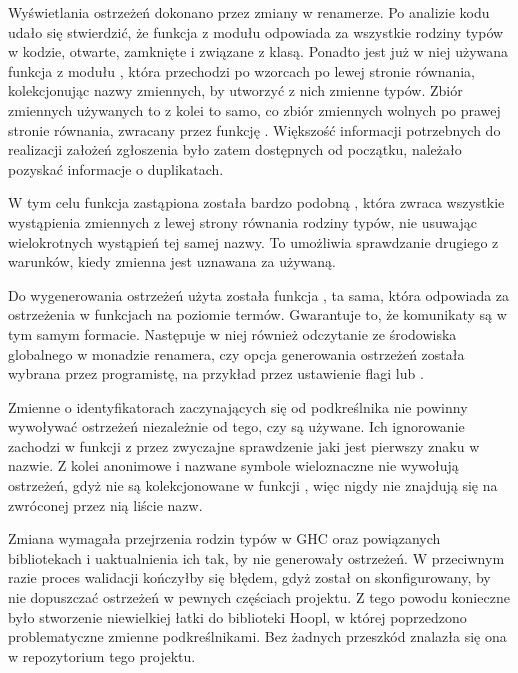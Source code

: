 Wyświetlania ostrzeżeń dokonano przez zmiany w renamerze. Po analizie kodu udało
się stwierdzić, że funkcja  z modułu  odpowiada za wszystkie rodziny
typów w kodzie, otwarte, zamknięte i związane z klasą. Ponadto jest już w niej
używana funkcja  z modułu , która
przechodzi po wzorcach po lewej stronie równania,
kolekcjonując nazwy zmiennych, by utworzyć z nich zmienne typów. Zbiór zmiennych
używanych to z kolei to samo, co zbiór zmiennych wolnych po prawej stronie
równania, zwracany przez funkcję . Większość informacji
potrzebnych do realizacji założeń zgłoszenia było zatem dostępnych od początku,
należało pozyskać informacje o duplikatach.

W tym celu funkcja  zastąpiona została
bardzo podobną , która zwraca wszystkie
wystąpienia zmiennych z lewej strony równania rodziny typów, nie usuwając wielokrotnych wystąpień tej samej
nazwy. To umożliwia sprawdzanie drugiego z warunków, kiedy zmienna jest
uznawana za używaną.

Do wygenerowania ostrzeżeń użyta została funkcja , ta
sama, która odpowiada za ostrzeżenia w funkcjach na poziomie termów. Gwarantuje
to, że komunikaty są w tym samym formacie. Następuje w niej również
odczytanie ze środowiska globalnego w monadzie renamera, czy opcja generowania
ostrzeżeń została wybrana przez programistę, na przykład przez ustawienie flagi
 lub .

Zmienne o identyfikatorach zaczynających się od podkreślnika nie powinny wywoływać
ostrzeżeń niezależnie od tego, czy są używane. Ich ignorowanie zachodzi w
funkcji  z  przez zwyczajne sprawdzenie jaki
jest pierwszy znaku w nazwie.
Z kolei anonimowe i nazwane symbole wieloznaczne nie wywołują ostrzeżeń, gdyż nie
są kolekcjonowane w funkcji , więc nigdy nie
znajdują się na zwróconej przez nią liście nazw.

Zmiana wymagała przejrzenia rodzin typów w GHC oraz powiązanych bibliotekach i
uaktualnienia ich tak, by nie generowały ostrzeżeń. W przeciwnym razie proces
walidacji kończyłby się błędem, gdyż został on skonfigurowany, by nie dopuszczać
ostrzeżeń w pewnych częściach projektu. Z tego powodu konieczne było stworzenie
niewielkiej łatki do biblioteki Hoopl, w której poprzedzono problematyczne
zmienne podkreślnikami. Bez żadnych przeszkód znalazła się ona w repozytorium
tego projektu.


